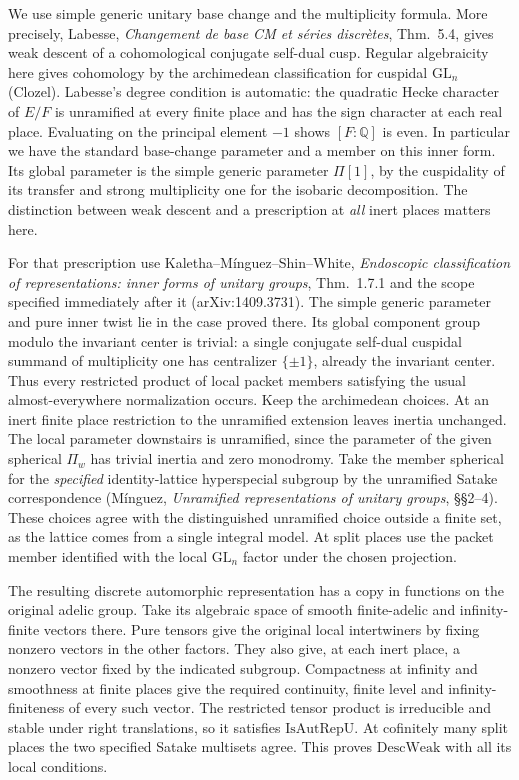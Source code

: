 We use simple generic unitary base change and the multiplicity
formula. More precisely, Labesse, \emph{Changement de base CM et
s\'eries discr\`etes}, Thm.~5.4, gives weak descent of a
cohomological conjugate self-dual cusp. Regular algebraicity
here gives cohomology by the archimedean classification for
cuspidal $\mathrm{GL}_n$ (Clozel). Labesse's degree condition
is automatic: the quadratic Hecke character of $E/F$ is
unramified at every finite place and has the sign character at
each real place. Evaluating on the principal element $-1$ shows
$[F:\mathbb Q]$ is even. In particular we have the standard
base-change parameter and a member on this inner form.
Its global parameter is the simple generic parameter $\Pi[1]$,
by the cuspidality of its transfer and strong multiplicity one
for the isobaric decomposition. The distinction between weak
descent and a prescription at \emph{all} inert places matters
here.

For that prescription use Kaletha--M\'inguez--Shin--White,
\emph{Endoscopic classification of representations: inner forms
of unitary groups}, Thm.~1.7.1 and the scope specified immediately
after it (arXiv:1409.3731). The simple generic parameter and pure
inner twist lie in the case proved there. Its global component
group modulo the invariant center is trivial: a single
conjugate self-dual cuspidal summand of multiplicity one has
centralizer $\{\pm1\}$, already the invariant center.
Thus every restricted product of local packet members satisfying
the usual almost-everywhere normalization occurs. Keep the
archimedean choices. At an inert finite place restriction to
the unramified extension leaves inertia unchanged. The local
parameter downstairs is unramified, since the parameter of the
given spherical $\Pi_w$ has trivial inertia and zero monodromy.
Take the member spherical for the \emph{specified} identity-lattice
hyperspecial subgroup by the unramified Satake correspondence
(M\'inguez, \emph{Unramified representations of unitary groups},
\S\S2--4). These choices agree with the distinguished unramified
choice outside a finite set, as the lattice comes from a single
integral model. At split places use the packet member identified
with the local $\mathrm{GL}_n$ factor under the chosen projection.

The resulting discrete automorphic representation has a copy
in functions on the original adelic group. Take its algebraic
space of smooth finite-adelic and infinity-finite vectors there.
Pure tensors give the original local intertwiners by fixing
nonzero vectors in the other factors. They also give, at each
inert place, a nonzero vector fixed by the indicated subgroup.
Compactness at infinity and smoothness at finite places give
the required continuity, finite level and infinity-finiteness
of every such vector. The restricted tensor product is
irreducible and stable under right translations, so it satisfies
$\mathrm{IsAutRepU}$. At cofinitely many split places the two
specified Satake multisets agree. This proves $\mathrm{DescWeak}$
with all its local conditions.

